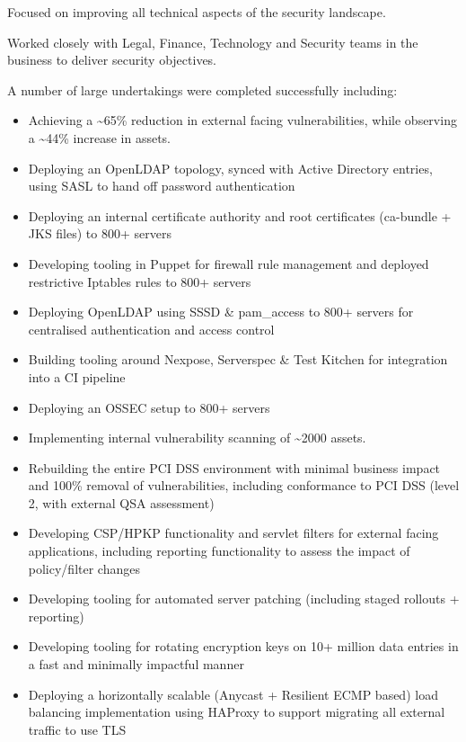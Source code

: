 Focused on improving all technical aspects of the security landscape.

Worked closely with Legal, Finance, Technology and Security teams in the
business to deliver security objectives.

A number of large undertakings were completed successfully including:

\begin{itemize}
\tightlist
\item
  Achieving a \textasciitilde{}65\% reduction in external facing
  vulnerabilities, while observing a \textasciitilde{}44\% increase in
  assets.
\item
  Deploying an OpenLDAP topology, synced with Active Directory entries,
  using SASL to hand off password authentication
\item
  Deploying an internal certificate authority and root certificates
  (ca-bundle + JKS files) to 800+ servers
\item
  Developing tooling in Puppet for firewall rule management and deployed
  restrictive Iptables rules to 800+ servers
\item
  Deploying OpenLDAP using SSSD \& pam\_access to 800+ servers for
  centralised authentication and access control
\item
  Building tooling around Nexpose, Serverspec \& Test Kitchen for
  integration into a CI pipeline
\item
  Deploying an OSSEC setup to 800+ servers
\item
  Implementing internal vulnerability scanning of \textasciitilde{}2000
  assets.
\item
  Rebuilding the entire PCI DSS environment with minimal business impact
  and 100\% removal of vulnerabilities, including conformance to PCI DSS
  (level 2, with external QSA assessment)
\item
  Developing CSP/HPKP functionality and servlet filters for external
  facing applications, including reporting functionality to assess the
  impact of policy/filter changes
\item
  Developing tooling for automated server patching (including staged
  rollouts + reporting)
\item
  Developing tooling for rotating encryption keys on 10+ million data
  entries in a fast and minimally impactful manner
\item
  Deploying a horizontally scalable (Anycast + Resilient ECMP based)
  load balancing implementation using HAProxy to support migrating all
  external traffic to use TLS
\end{itemize}

